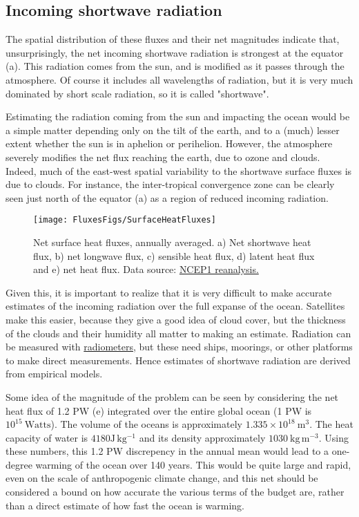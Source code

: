 \subsection{Incoming shortwave radiation}

The spatial distribution of these fluxes and their net magnitudes indicate that, unsurprisingly, the net incoming shortwave radiation is strongest at the equator (a).  This radiation comes from the sun, and is modified as it passes through the atmosphere.  Of course it includes all wavelengths of radiation, but it is very much dominated by short scale radiation, so it is called "shortwave".  

Estimating the radiation coming from the sun and impacting the ocean would be a simple matter depending only on the tilt of the earth, and to a (much) lesser extent whether the sun is in aphelion or perihelion.  However, the atmosphere severely modifies the net flux reaching the earth, due to ozone and clouds.  Indeed, much of the east-west spatial variability to the shortwave surface fluxes is due to clouds. For instance, the inter-tropical convergence zone can be clearly seen just north of the equator (a) as a region of reduced incoming radiation.  

\begin{figure}[htb]
  \centering
  \texttt{[image: FluxesFigs/SurfaceHeatFluxes]}
  \caption{Net surface heat fluxes, annually averaged.  a) Net shortwave heat flux, b) net longwave flux, c) sensible heat flux, d) latent heat flux and e) net heat flux. 
  Data source:  \href{https://psl.noaa.gov/data/gridded/data.ncep.reanalysis.derived.surfaceflux.html}{NCEP1 reanalysis.}  }
  \label{fig:SurfaceHeatFluxes}
\end{figure}

Given this, it is important to realize that it is very difficult to make accurate estimates of the incoming radiation over the full expanse of the ocean.  Satellites make this easier, because they give a good idea of cloud cover, but the thickness of the clouds and their humidity all matter to making an estimate.  Radiation can be measured with \href{https://en.wikipedia.org/wiki/Radiometer}{radiometers}, but these need ships, moorings, or other platforms to make direct measurements. Hence estimates of shortwave radiation are derived from empirical models.  

Some idea of the magnitude of the problem can be seen by considering the net heat flux of 1.2 PW (e) integrated over the entire global ocean (1 PW is $10^{15}\ \mathrm{Watts}$). The volume of the oceans is approximately $1.335\times10^{18}\ \mathrm{m^3}$. The heat capacity of water is $4180 \mathrm{J\, kg^{-1}}$ and its density approximately $1030 \ \mathrm{kg\,m^{-3}}$.  Using these numbers, this 1.2 PW discrepency in the annual mean would lead to a one-degree warming of the ocean over 140 years.  This would be quite large and rapid, even on the scale of anthropogenic climate change, and this net should be considered a bound on how accurate the various terms of the budget are, rather than a direct estimate of how fast the ocean is warming.  

